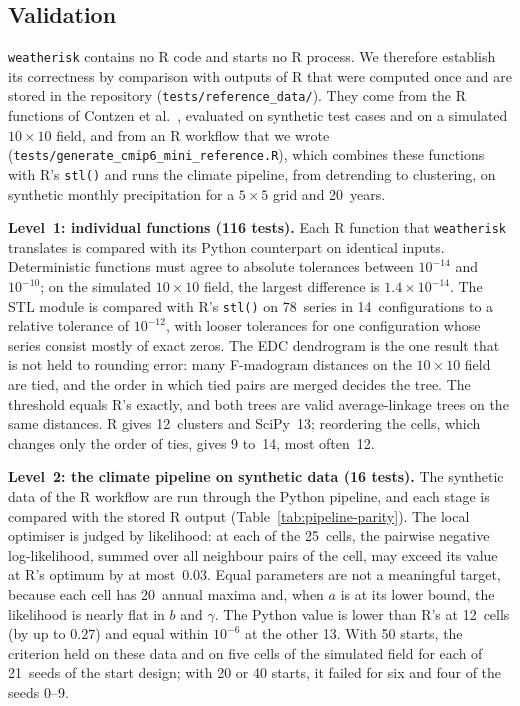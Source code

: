 \documentclass[preprint,12pt,a4paper]{elsarticle}
\newcommand{\rev}[1]{{#1}}
\begin{document}
\rev{\subsection{Validation}
\label{sec:validation}}

\texttt{weatherisk} contains no R code and starts no R process. We
therefore establish its correctness by comparison with outputs of R
that were computed once and are stored in the repository
(\texttt{tests/reference\_data/}). They come from the R functions of
Contzen et al.~\cite{contzen2025}, evaluated on synthetic test cases
and on a simulated $10{\times}10$ field, and from an R workflow that
we wrote (\texttt{tests/generate\_cmip6\_mini\_reference.R}), which
combines these functions with R's \texttt{stl()} and runs the
climate pipeline, from detrending to clustering, on synthetic monthly
precipitation for a $5{\times}5$ grid and 20~years.

\textbf{Level~1: individual functions (116 tests).}
Each R function that \texttt{weatherisk} translates is compared with
its Python counterpart on identical inputs. Deterministic functions
must agree to absolute tolerances between $10^{-14}$ and $10^{-10}$;
on the simulated $10{\times}10$ field, the largest difference is
$1.4\times10^{-14}$. The STL module is compared with R's
\texttt{stl()} on 78~series in 14~configurations to a relative
tolerance of $10^{-12}$, with looser tolerances for one configuration
whose series consist mostly of exact zeros. The EDC dendrogram is the one result that is not
held to rounding error: many F-madogram distances on the
$10{\times}10$ field are tied, and the order in which tied pairs
are merged decides the tree. The threshold equals R's exactly, and
both trees are valid average-linkage trees on the same distances.
R gives 12~clusters and SciPy~13; reordering the cells, which
changes only the order of ties, gives 9 to~14, most often~12.

\textbf{Level~2: the climate pipeline on synthetic data (16 tests).}
The synthetic data of the R workflow are run through the Python
pipeline, and each stage is compared with the stored R output
(Table~\ref{tab:pipeline-parity}). The local optimiser is judged by
likelihood: at each of the 25~cells, the pairwise negative
log-likelihood, summed over all neighbour pairs of the cell, may
exceed its value at R's optimum by at most~0.03. Equal parameters
are not a meaningful target, because each cell has 20~annual maxima
and, when $a$ is at its lower bound, the likelihood is nearly flat
in $b$ and $\gamma$. The Python value is lower than R's at 12~cells
(by up to $0.27$) and equal within $10^{-6}$ at the other 13. With
50 starts, the criterion held on these data and on five cells of the
simulated field for each of 21~seeds of the start design; with 20 or
40 starts, it failed for six and four of the seeds 0--9.
\end{document}
